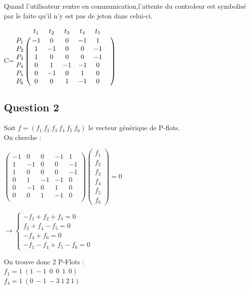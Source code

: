 Quand l'utilisateur rentre en communication,l'attente du controleur est symbolisé par le faite qu'il n'y est pas de jeton dans celui-ci.

\begin{center}

{\Huge C}\qquad =\qquad $\bordermatrix{
&t_1&t_2&t_3&t_4&t_5&\cr
P_1&-1&0&0&-1&1\cr
P_2&1&-1&0&0&-1\cr
P_3&1&0&0&0&-1\cr
P_4&0&1&-1&-1&0\cr
P_5&0&-1&0&1&0\cr
P_6&0&0&1&-1&0\cr
}$

\end{center}

\subsection{Question 2}
Soit $f=(f_1\ f_2\ f_3\ f_4\ f_5\ f_6)$ le vecteur générique de P-flots.\\
On cherche : 
\begin{center}
$\begin{pmatrix}
-1 & 0 & 0 & -1 & 1\\
 1 & -1 & 0 & 0 & -1\\
 1 & 0 & 0 & 0 & -1\\
 0 & 1 & -1 & -1 & 0\\
 0 & -1 & 0 & 1 & 0\\ 
 0 & 0 & 1 & -1 & 0\\
\end{pmatrix}
\begin{pmatrix}
f_1\\
f_2\\ 
f_3\\ 
f_4\\ 
f_5\\ 
f_6
\end{pmatrix}
=0
$

\vspace{0.5cm}

$\rightarrow 
\begin{cases}
-f_1 + f_2 + f_3 = 0\\
f_2 + f_4 - f_5  = 0\\
-f_4 + f_6  = 0\\
-f_1 - f_4 + f_5 - f_6 = 0
\end{cases}$

\vspace{0.5cm}
On trouve donc 2 P-Flots :\\
$
f_1 = 1 \ (1 \ -1 \ \ 0 \ \ 0 \ \ 1 \ \ 0)
$
\\
$
f_4 = 1 \ (0 \ -1 \ -3 \ 1 \ 2 \ 1)
$

\end{center}
